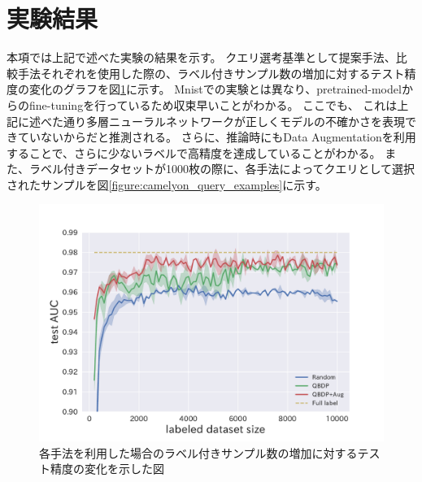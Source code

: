 \section{実験結果}
本項では上記で述べた実験の結果を示す。
クエリ選考基準として提案手法、比較手法それぞれを使用した際の、ラベル付きサンプル数の増加に対するテスト精度の変化のグラフを図\ref{fig:camelyon_acc_graph}に示す。
Mnistでの実験とは異なり、pretrained-modelからのfine-tuningを行っているため収束早いことがわかる。
ここでも、
これは上記に述べた通り多層ニューラルネットワークが正しくモデルの不確かさを表現できていないからだと推測される。
さらに、推論時にもData Augmentationを利用することで、さらに少ないラベルで高精度を達成していることがわかる。
また、ラベル付きデータセットが1000枚の際に、各手法によってクエリとして選択されたサンプルを図\ref{figure:camelyon_query_examples}に示す。

\begin{figure}[tbp]
    \label{fig:camelyon_acc_graph}
     \begin{center}
      \includegraphics[width=12cm]{figures/camelyon_acc_graph.pdf}
     \end{center}
    \caption{各手法を利用した場合のラベル付きサンプル数の増加に対するテスト精度の変化を示した図}
\end{figure}

